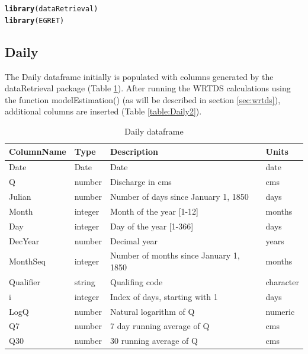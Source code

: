 \documentclass[a4paper,11pt]{article}\usepackage[]{graphicx}\usepackage[]{color}
\makeatletter
\newcommand{\hlstd}[1]{\textcolor[rgb]{0.345,0.345,0.345}{#1}}%
\newcommand{\hlkwd}[1]{\textcolor[rgb]{0.737,0.353,0.396}{\textbf{#1}}}%
\newenvironment{kframe}{%
 \def\at@end@of@kframe{}%
 \ifinner\ifhmode%
  \def\at@end@of@kframe{\end{minipage}}%
  \begin{minipage}{\columnwidth}%
 \fi\fi%
 \def\FrameCommand##1{\hskip\@totalleftmargin \hskip-\fboxsep
 \colorbox{shadecolor}{##1}\hskip-\fboxsep
     \hskip-\linewidth \hskip-\@totalleftmargin \hskip\columnwidth}%
 \MakeFramed {\advance\hsize-\width
   \@totalleftmargin\z@ \linewidth\hsize
   \@setminipage}}%
 {\par\unskip\endMakeFramed%
 \at@end@of@kframe}
\newenvironment{knitrout}{}{} %
\makeatother
\begin{document}
\begin{knitrout}
\color{fgcolor}\begin{kframe}
\begin{alltt}
\hlkwd{library}\hlstd{(dataRetrieval)}
\hlkwd{library}\hlstd{(EGRET)}
\end{alltt}
\end{kframe}
\end{knitrout}


\subsection{Daily}
\label{sec:dataframesDaily}
The Daily dataframe initially is populated with columns generated by the dataRetrieval package (Table \ref{table:Daily1}).  After running the WRTDS calculations using the function modelEstimation() (as will be described in section \ref{sec:wrtds}), additional columns are inserted (Table \ref{table:Daily2}).

\begin{table}[!ht]
\centering
\caption{Daily dataframe} 
\label{table:Daily1}
\begin{tabular}{llll}
  \hline
ColumnName & Type & Description & Units \\ 
  \hline
  Date & Date & Date & date \\ 
  Q & number & Discharge in cms & cms \\ 
  Julian & number & Number of days since January 1, 1850 & days \\ 
  Month & integer & Month of the year [1-12] & months \\ 
  Day & integer & Day of the year [1-366] & days \\ 
  DecYear & number & Decimal year & years \\ 
  MonthSeq & integer & Number of months since January 1, 1850 & months \\ 
  Qualifier & string & Qualifing code & character \\ 
  i & integer & Index of days, starting with 1 & days \\ 
  LogQ & number & Natural logarithm of Q & numeric \\ 
  Q7 & number & 7 day running average of Q & cms \\ 
  Q30 & number & 30 running average of Q & cms \\ 
   \hline
\end{tabular}
\end{table}
\end{document}

